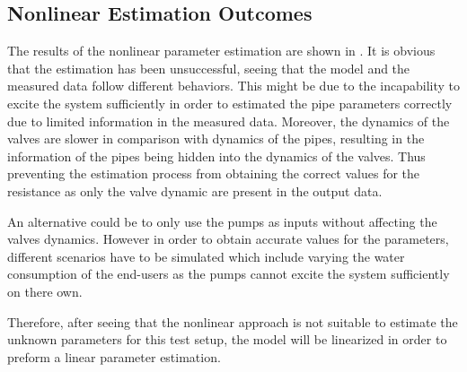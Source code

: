 \subsection{Nonlinear Estimation Outcomes} 
\label{NonLiOutcome}
The results of the nonlinear parameter estimation are shown in . It is obvious that the estimation has been unsuccessful, seeing 
that the model and the measured data follow different behaviors. This might be due to the incapability to excite the system sufficiently in order to estimated the pipe parameters correctly due to limited information in the measured data. Moreover, the dynamics of the valves are slower in comparison with dynamics of the pipes, resulting in the information of the pipes being hidden into the dynamics of the valves. Thus preventing the estimation process from obtaining the correct values for the resistance as only the valve dynamic are present in the output data.

An alternative could be to only use the pumps as inputs without affecting
the valves dynamics. However in order to obtain accurate values for the parameters, different scenarios have to be simulated which include varying the water consumption 
of the end-users as the pumps cannot excite the system sufficiently on there own. 

Therefore, after seeing that the nonlinear approach is not suitable to estimate the unknown parameters for this test setup, the model will be linearized in order to preform a linear parameter estimation.